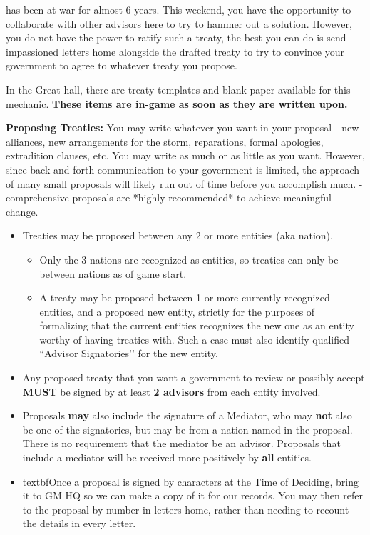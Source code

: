 \documentclass[green]{GL2020}
\begin{document}
\name{\gTreaty{}}

\pEarth{} has been at war for almost 6 years. This weekend, you have the opportunity to collaborate with other advisors here to try to hammer out a solution. However, you do not have the power to ratify such a treaty, the best you can do is send impassioned letters home alongside the drafted treaty to try to convince your government to agree to whatever treaty you propose. 

In the Great hall, there are treaty templates and blank paper available for this mechanic. \textbf{These items are in-game as soon as they are written upon.}

\textbf{Proposing Treaties:}
You may write whatever you want in your proposal - new alliances, new arrangements for the storm, reparations, formal apologies, extradition clauses, etc. You may write as much or as little as you want. However, since back and forth communication to your government is limited, the approach of many small proposals will likely run out of time before you accomplish much. - comprehensive proposals are *highly recommended* to achieve meaningful change.
\begin{itemize}
  \item Treaties may be proposed between any 2 or more entities (aka nation). 
  \begin{itemize}
    \item Only the 3 nations are recognized as entities, so treaties can only be between nations as of game start.
    \item A treaty may be proposed between 1 or more currently recognized entities, and a proposed new entity, strictly for the purposes of formalizing that the current entities recognizes the new one as an entity worthy of having treaties with. Such a case must also identify qualified ``Advisor Signatories’’ for the new entity.
  \end{itemize}
  \item Any proposed treaty that you want a government to review or possibly accept \textbf{MUST} be signed by at least \textbf{2 advisors} from each entity involved.
  \item Proposals \textbf{may} also include the signature of a Mediator, who may \textbf{not} also be one of the signatories, but may be from a nation named in the proposal. There is no requirement that the mediator be an advisor. Proposals that include a mediator will be received more positively by \textbf{all} entities.
  \item textbf{Once a proposal is signed by characters at the Time of Deciding, bring it to GM HQ} so we can make a copy of it for our records. You may then refer to the proposal by number in letters home, rather than needing to recount the details in every letter.
\end{itemize}
\end{document}
